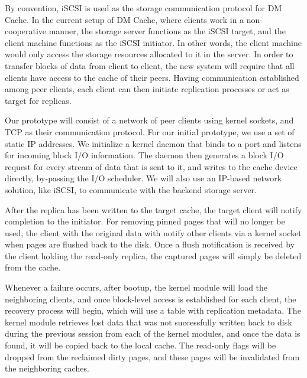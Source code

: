 By convention, iSCSI is used as the storage communication
protocol for DM Cache. In the current setup of DM Cache,
where clients work in a non-cooperative manner, the storage
server functions as the iSCSI target, and the client machine
functions as the iSCSI initiator. In other words, the client
machine would only access the storage resources allocated to
it in the server. In order to transfer blocks of data from
client to client, the new system will require that all
clients have access to the cache of their peers. Having
communication established among peer clients, each client can
then initiate replication processes or act as
target for replicas.

Our prototype will consist of a network of peer
clients using kernel sockets, and TCP as their communication
protocol. For our initial prototype, we use a set of static
IP addresses. We initialize a kernel daemon that binds to a
port and listens for incoming block I/O information. The
daemon then generates a block I/O request for every stream
of data that is sent to it, and writes to the cache device
directly, by-passing the I/O scheduler. We will also use an
IP-based network solution, like iSCSI, to communicate with
the backend storage server.

After the replica has been written to the target cache,
the target client will notify completion to the initiator.
For removing pinned pages that will no longer be used, the
client with the original data with notify other clients
via a kernel socket when pages are flushed back to the disk.
Once a flush notification is received by the client holding
the read-only replica, the captured pages will simply be
deleted from the cache. 


Whenever a failure occurs, after bootup, the kernel module will load the neighboring
clients, and once block-level access is established for each client, the recovery process
will begin, which will use a table with replication metadata. The kernel module retrieves lost data
that was not successfully written back to disk during the previous session from each of the kernel modules, and once the
data is found, it will be copied back to the local cache. The read-only flags will be
dropped from the reclaimed dirty pages, and these pages will be invalidated from the neighboring caches.

\label{approach}
